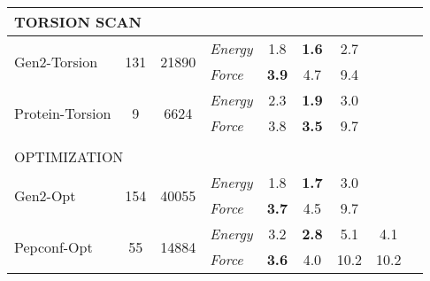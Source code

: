 \documentclass[varwidth]{standalone}
\newcommand{\widthbetweentype}{7pt}
\begin{document}
\begin{adjustbox}{width=\textwidth,center}
\begin{tabular}{l c c l c c c c c}
\multicolumn{8}{l}{\small{TORSION SCAN}} \\\hline
\multirow{2}{*}{Gen2-Torsion} & \multirow{2}{*}{131} & \multirow{2}{*}{21890} & \textit{Energy} & 1.8 & \textbf{1.6} & 2.7 & \\
                                   &                       &                         & \textit{Force}  & \textbf{3.9} & 4.7 & 9.4 & \\
\hline
\multirow{2}{*}{Protein-Torsion} & \multirow{2}{*}{9} & \multirow{2}{*}{6624} & \textit{Energy} & 2.3 & \textbf{1.9} & 3.0 & \\
                                   &                       &                         & \textit{Force}  & 3.8 & \textbf{3.5} & 9.7 & \\
\hline
\multicolumn{8}{l}{\vspace{\widthbetweentype}} \\[-1em]
\multicolumn{8}{l}{\small{OPTIMIZATION}} \\\hline
\multirow{2}{*}{Gen2-Opt} & \multirow{2}{*}{154} & \multirow{2}{*}{40055} & \textit{Energy} & 1.8 & \textbf{1.7} & 3.0 & \\
                                   &                       &                         & \textit{Force}  & \textbf{3.7} & 4.5 & 9.7 & \\
\hline
\multirow{2}{*}{Pepconf-Opt} & \multirow{2}{*}{55} & \multirow{2}{*}{14884} & \textit{Energy} & 3.2 & \textbf{2.8} & 5.1 & 4.1\\
                                   &                       &                         & \textit{Force}  & \textbf{3.6} & 4.0 & 10.2 & 10.2\\
\hline
\hline
\hline
\end{tabular}

\end{adjustbox}
\end{document}

